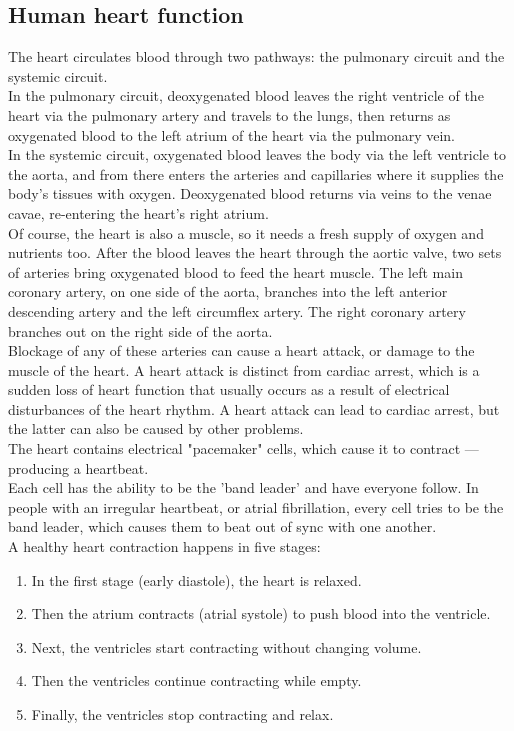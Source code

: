 \subsection{Human heart function}
The heart circulates blood through two pathways: the pulmonary circuit and the systemic circuit.\\
In the pulmonary circuit, deoxygenated blood leaves the right ventricle of the heart via the pulmonary artery and travels to the lungs, then returns as oxygenated blood to the left atrium of the heart via the pulmonary vein.\\
In the systemic circuit, oxygenated blood leaves the body via the left ventricle to the aorta, and from there enters the arteries and capillaries where it supplies the body's tissues with oxygen. Deoxygenated blood returns via veins to the venae cavae, re-entering the heart's right atrium.\\
Of course, the heart is also a muscle, so it needs a fresh supply of oxygen and nutrients too. After the blood leaves the heart through the aortic valve, two sets of arteries bring oxygenated blood to feed the heart muscle. The left main coronary artery, on one side of the aorta, branches into the left anterior descending artery and the left circumflex artery. The right coronary artery branches out on the right side of the aorta.\\
Blockage of any of these arteries can cause a heart attack, or damage to the muscle of the heart. A heart attack is distinct from cardiac arrest, which is a sudden loss of heart function that usually occurs as a result of electrical disturbances of the heart rhythm. A heart attack can lead to cardiac arrest, but the latter can also be caused by other problems.\\
The heart contains electrical "pacemaker" cells, which cause it to contract — producing a heartbeat.\\
Each cell has the ability to be the 'band leader' and have everyone follow. In people with an irregular heartbeat, or atrial fibrillation, every cell tries to be the band leader, which causes them to beat out of sync with one another.\\
A healthy heart contraction happens in five stages:
\begin{enumerate}
	\item In the first stage (early diastole), the heart is relaxed.
	\item Then the atrium contracts (atrial systole) to push blood into the ventricle.
	\item Next, the ventricles start contracting without changing volume.
	\item Then the ventricles continue contracting while empty.
	\item Finally, the ventricles stop contracting and relax.
\end{enumerate}
